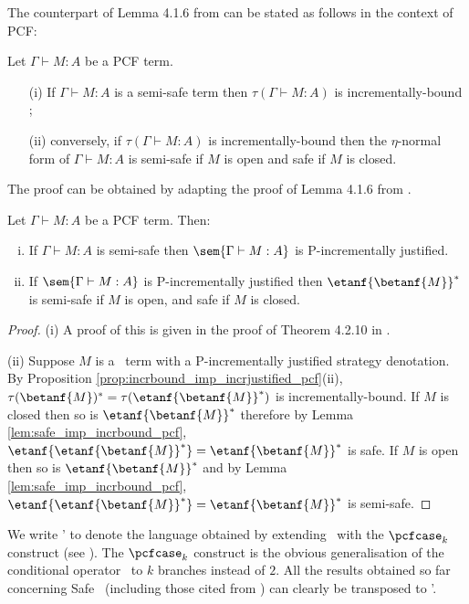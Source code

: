 The counterpart of Lemma 4.1.6 from
\cite{blumtransfer} can be stated as follows in the context of PCF:
\begin{lemma}
\label{lem:safe_imp_incrbound_pcf} Let $\Gamma \vdash M : A$ be a PCF term.
\begin{itemize}
\item[(i)] If $\Gamma \vdash M : A$ is a semi-safe term then $\tau(\Gamma \vdash M : A)$ is incrementally-bound ;
\item[(ii)] conversely, if $\tau(\Gamma \vdash M : A)$ is incrementally-bound then the $\eta$-normal form of $\Gamma \vdash M : A$ is semi-safe if $M$ is open and safe if $M$ is closed.
\end{itemize}
\end{lemma}
The proof can be obtained by adapting the proof
of Lemma 4.1.6 from \cite{blumtransfer}.

\begin{theorem}
\label{thm:semisafeincrejust_pcf} Let $\Gamma \vdash M : A$ be a PCF term. Then:
\begin{enumerate}[(i)]
\item If $\Gamma \vdash M : A$ is semi-safe then $\sem{\Gamma \vdash M : A}$ is P-incrementally justified.
\item If $\sem{\Gamma \vdash M : A}$ is
  P-incrementally justified then $\etanf{\betanf{M}}^*$ is semi-safe  if $M$ is open, and safe if $M$ is closed.
\end{enumerate}
\end{theorem}

\begin{proof}
\noindent(i)
A proof of this is given in the proof of Theorem 4.2.10 in \cite{blumtransfer}.

\noindent(ii)
Suppose $M$ is a \pcf\ term with a P-incrementally justified strategy denotation. By Proposition \ref{prop:incrbound_imp_incrjustified_pcf}(ii), $\tau(\betanf{M})^* = \tau(\etanf{\betanf{M}}^*)$ is incrementally-bound.
If $M$ is closed then so is $\etanf{\betanf{M}}^*$ therefore by Lemma \ref{lem:safe_imp_incrbound_pcf}, $\etanf{\etanf{\betanf{M}}^*} = \etanf{\betanf{M}}^*$ is safe. If $M$ is open then so is $\etanf{\betanf{M}}^*$ and by Lemma \ref{lem:safe_imp_incrbound_pcf}, $\etanf{\etanf{\betanf{M}}^*} = \etanf{\betanf{M}}^*$ is semi-safe.
\end{proof}


We write \pcf' to denote the language obtained by extending \pcf\
with the $\pcfcase_k$ construct (see \cite{Abr02}).
The $\pcfcase_k$ construct is the obvious generalisation of the
conditional operator \pcfcond\ to $k$ branches instead of $2$. All the results obtained so far concerning Safe \pcf\ (including those
cited from \cite{blumtransfer}) can clearly be transposed to \pcf'.

